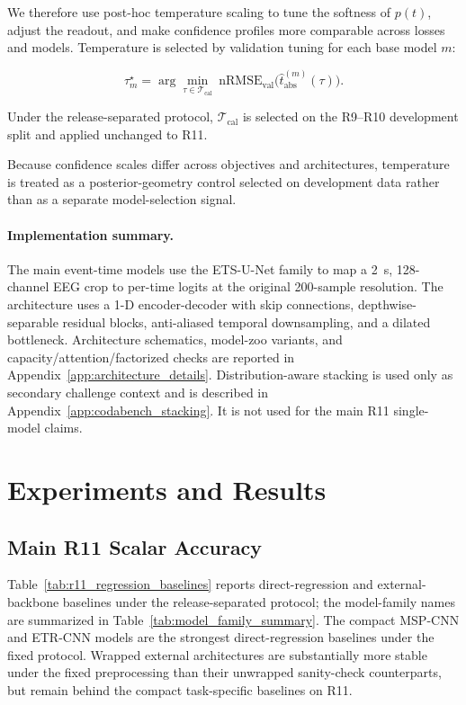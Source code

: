 \documentclass[12pt]{article}
\begin{document}
We therefore use post-hoc temperature scaling \citep{guo2017calibration} to tune the softness of $p(t)$, adjust the
readout, and make confidence profiles more comparable across losses and models.
Temperature is selected by validation tuning for each base model $m$:

\begin{equation}
\label{eq:rt_tau_tuning}
\tau_m^\star = \arg\min_{\tau\in\mathcal{T}_{\text{cal}}}
\ \mathrm{nRMSE}_{\text{val}}\big(\hat t_{\mathrm{abs}}^{(m)}(\tau)\big).
\end{equation}

Under the release-separated protocol, $\mathcal{T}_{\text{cal}}$ is selected on the R9--R10 development split and applied unchanged to R11.

Because confidence scales differ across objectives and architectures, temperature is treated as a posterior-geometry
control selected on development data rather than as a separate model-selection signal.



\paragraph{Implementation summary.}
The main event-time models use the ETS-U-Net family to map a 2~s, 128-channel EEG crop to per-time logits at the original 200-sample resolution. The architecture uses a 1-D encoder-decoder with skip connections, depthwise-separable residual blocks, anti-aliased temporal downsampling, and a dilated bottleneck. Architecture schematics, model-zoo variants, and capacity/attention/factorized checks are reported in Appendix~\ref{app:architecture_details}. Distribution-aware stacking is used only as secondary challenge context and is described in Appendix~\ref{app:codabench_stacking}. It is not used for the main R11 single-model claims.


\section{Experiments and Results}

\subsection{Main R11 Scalar Accuracy}
\label{sec:results_scalar}

Table~\ref{tab:r11_regression_baselines} reports direct-regression and external-backbone baselines under the release-separated protocol; the model-family names are summarized in Table~\ref{tab:model_family_summary}. The compact MSP-CNN and ETR-CNN models are the strongest direct-regression baselines under the fixed protocol. Wrapped external architectures are substantially more stable under the fixed preprocessing than their unwrapped sanity-check counterparts, but remain behind the compact task-specific baselines on R11.
\end{document}
